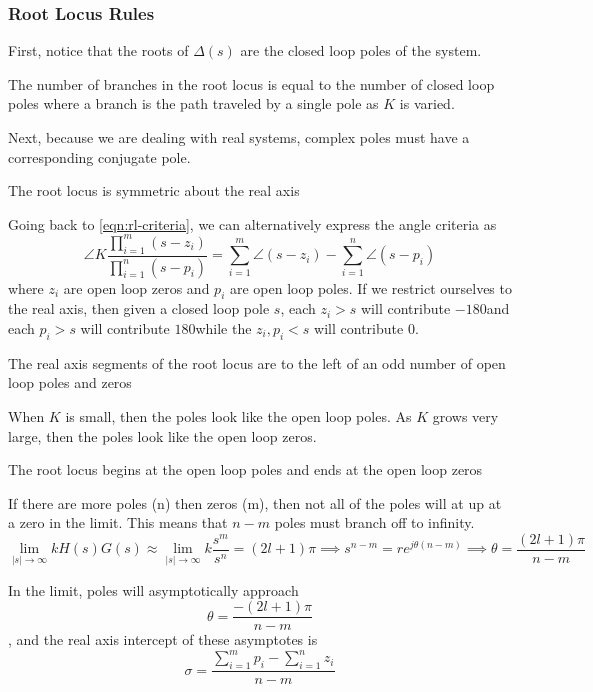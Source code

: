 \subsubsection{Root Locus Rules}
First, notice that the roots of $\Delta(s)$ are the closed loop poles of the system. 
\begin{theorem}
  The number of branches in the root locus is equal to the number of closed loop poles where a branch is the path traveled by a single pole as $K$ is varied.
  \label{thm:rl-one}
\end{theorem}
Next, because we are dealing with real systems, complex poles must have a corresponding conjugate pole.
\begin{theorem}
  The root locus is symmetric about the real axis
  \label{thm:rl-two}
\end{theorem}
Going back to \cref{eqn:rl-criteria}, we can alternatively express the angle criteria as
\[
  \angle K \frac{\prod_{i=1}^m (s-z_i)}{\prod_{i=1}^n (s-p_i)} = \sum_{i=1}^m \angle (s-z_i) - \sum_{i=1}^n \angle (s-p_i)
\]
where $z_i$ are open loop zeros and $p_i$ are open loop poles.
If we restrict ourselves to the real axis, then given a closed loop pole $s$, each $z_i > s$ will contribute $-180$\textdegree and each $p_i > s$ will contribute $180$\textdegree while the $z_i, p_i < s$ will contribute $0$\textdegree.
\begin{theorem}
  The real axis segments of the root locus are to the left of an odd number of open loop poles and zeros
  \label{thm:rl-three}
\end{theorem}
When $K$ is small, then the poles look like the open loop poles. As $K$ grows very large, then the poles look like the open loop zeros.
\begin{theorem}
  The root locus begins at the open loop poles and ends at the open loop zeros
  \label{eqn:rl-four}
\end{theorem}
If there are more poles (n) then zeros (m), then not all of the poles will at up at a zero in the limit. This means that $n-m$ poles must branch off to infinity.
\[
  \lim_{|s|\to\infty} kH(s)G(s) \approx \lim_{|s|\to\infty}k\frac{s^m}{s^n} = (2l+1)\pi \implies s^{n-m} = re^{j\theta(n-m)} \implies \theta = \frac{(2l+1)\pi}{n-m}
\]
\begin{theorem}
  In the limit, poles will asymptotically approach
  \[
	\theta = \frac{-(2l+1)\pi}{n-m}
  \]
  , and the real axis intercept of these asymptotes is
  \[
	\sigma = \frac{\sum_{i=1}^m p_i - \sum_{i=1}^n z_i}{n-m}
  \]
  \label{eqn:rl-five}
\end{theorem}
